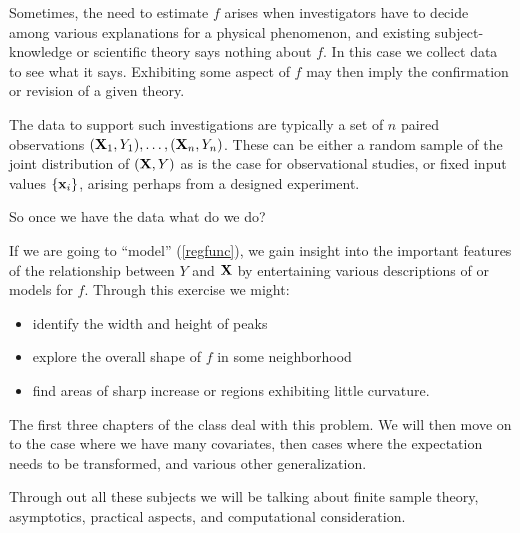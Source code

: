 Sometimes, the need to estimate $f$ arises when investigators have to
decide among various explanations for a physical phenomenon,
and existing subject-knowledge or scientific theory says nothing about
$f$. In this case we collect data to see what it says. Exhibiting some
aspect of $f$ may then imply the confirmation or 
revision of a given theory.  

The data to
support  such investigations are typically a set of $n$ paired
observations $({\mathbf X}_1,Y_1),\dots,({\mathbf X}_n,Y_n)$. These can be either a
random sample of  the joint distribution of $({\mathbf X},Y)$ as is the case
for observational studies, or fixed input values $\{ {\mathbf x}_i \}$, arising perhaps from a designed experiment. 

So once we have the data what do we do?

If we are going to ``model'' (\ref{regfunc}), we gain insight into the
important features of the relationship 
between $Y$ and ${\mathbf X}$ by entertaining various descriptions of or
models for $f$. Through this exercise we might:
\begin{itemize}
\item  identify the width and height of peaks
\item  explore the overall shape of $f$ in some neighborhood
\item find  areas of sharp increase or regions exhibiting little
  curvature.
\end{itemize}

The first three chapters of the class deal with this problem. We will
then move on to the case where we have many covariates, then cases
where the 
expectation needs to be transformed, and various other generalization.


Through out all these subjects we will be talking about finite sample
theory, asymptotics, practical aspects, and computational
consideration. 


